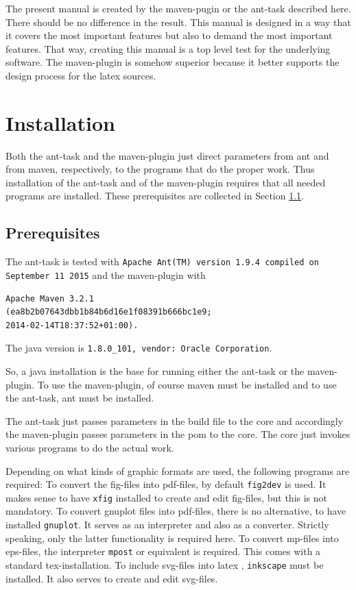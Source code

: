\documentclass[12pt]{article}
\begin{document}
The present manual is created by the maven-pugin or the ant-task 
described here. 
There should be no difference in the result. 
This manual is designed in a way that it covers the most important features 
but also to demand the most important features. 
That way, creating this manual is a top level test 
for the underlying software. 
The maven-plugin is somehow superior 
because it better supports the design process for the latex sources. 



\section{Installation}

Both the ant-task and the maven-plugin just direct parameters 
from ant and from maven, respectively, 
to the programs that do the proper work. 
Thus installation of the ant-task and of the maven-plugin 
requires that all needed programs are installed. 
These prerequisites are collected in Section \ref{subsec:prerequisites}. 

\subsection{Prerequisites}\label{subsec:prerequisites}

The ant-task is tested with 
{\tt Apache Ant(TM) version 1.9.4 compiled on September 11 2015}
and the maven-plugin with 
%
\begin{verbatim}
Apache Maven 3.2.1
(ea8b2b07643dbb1b84b6d16e1f08391b666bc1e9; 
2014-02-14T18:37:52+01:00). 
\end{verbatim}
The java version is {\tt 1.8.0\_101, vendor: Oracle Corporation}. 

So, a java installation is the base for running either the ant-task 
or the maven-plugin. 
To use the maven-plugin, of course maven must be installed 
and to use the ant-task, ant must be installed. 

The ant-task just passes parameters in the build file to the core 
and accordingly the maven-plugin passes parameters in the pom 
to the core. 
The core just invokes various programs to do the actual work. 

Depending on what kinds of graphic formats are used, 
the following programs are required: 
To convert the \gls{fig}-files into \gls{pdf}-files, 
by default {\tt fig2dev} is used. 
It makes sense to have {\tt xfig} installed 
to create and edit fig-files, but this is not mandatory. 
To convert gnuplot files into pdf-files, there is no alternative, 
to have installed {\tt gnuplot}. 
It serves as an interpreter and also as a converter. 
Strictly speaking, only the latter functionality is required here. 
To convert \gls{mp}-files into \gls{eps}-files, 
the interpreter {\tt mpost} or equivalent is required. 
This comes with a standard tex-installation. 
To include \gls{svg}-files into latex , 
{\tt inkscape} must be installed. 
It also serves to create and edit svg-files. 
\end{document}

